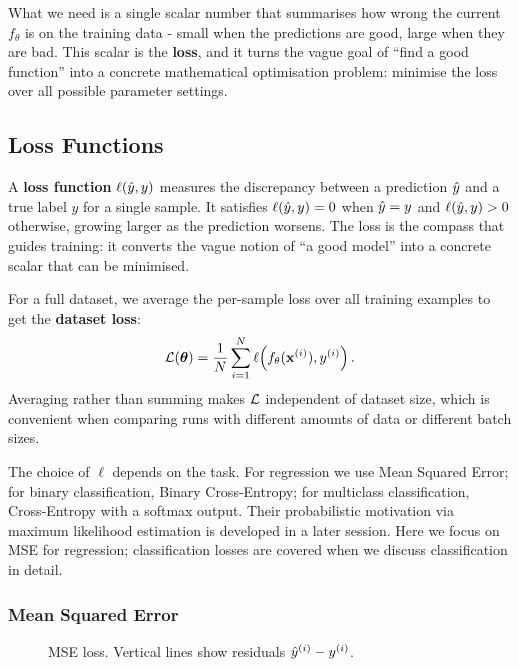 What we need is a single scalar number that summarises how wrong the current $f_\theta$ is on the training data - small when the predictions are good, large when they are bad. This scalar is the \textbf{loss}, and it turns the vague goal of ``find a good function'' into a concrete mathematical optimisation problem: minimise the loss over all possible parameter settings.

\subsection{Loss Functions}

A \textbf{loss function} $\ell(\hat{y}, y)$ measures the discrepancy between a prediction $\hat{y}$ and a true label $y$ for a single sample. It satisfies $\ell(\hat{y}, y) = 0$ when $\hat{y} = y$ and $\ell(\hat{y}, y) > 0$ otherwise, growing larger as the prediction worsens. The loss is the compass that guides training: it converts the vague notion of ``a good model'' into a concrete scalar that can be minimised.

For a full dataset, we average the per-sample loss over all training examples to get the \textbf{dataset loss}:
\begin{equation}
\mathcal{L}(\boldsymbol{\theta}) = \frac{1}{N} \sum_{i=1}^{N} \ell\!\left(f_\theta(\mathbf{x}^{(i)}), y^{(i)}\right).
\end{equation}
Averaging rather than summing makes $\mathcal{L}$ independent of dataset size, which is convenient when comparing runs with different amounts of data or different batch sizes.

The choice of $\ell$ depends on the task. For regression we use Mean Squared Error; for binary classification, Binary Cross-Entropy; for multiclass classification, Cross-Entropy with a softmax output. Their probabilistic motivation via maximum likelihood estimation is developed in a later session. Here we focus on MSE for regression; classification losses are covered when we discuss classification in detail.

\subsubsection{Mean Squared Error}

\begin{figure}
\centering
{}
\resizebox{0.33\textwidth}{!}{}
\caption{MSE loss. Vertical lines show residuals $\hat{y}^{(i)} - y^{(i)}$.}
\label{fig:mse_loss}
\end{figure}

